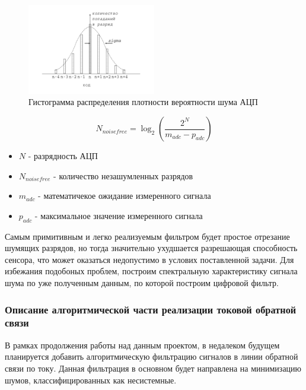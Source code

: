 \begin{figure}[!ht]
    \centering
    \includegraphics[width=0.5\textwidth, keepaspectratio, clip=true, trim=5mm 10mm 5mm 5mm]
                    {./src/pictures/adc_noise_probabilistic_estimate}
    \caption{Гистограмма распределения плотности вероятности шума АЦП}
    \label{pic_adc_noise_probabilistic_estimate}
\end{figure}

\begin{equation}
    \label{eq_noise_free_code_resolution}
    N_{noise free} = \log_{2}{( \frac{ 2^{N} }{ m_{adc} - p_{adc} } )}
\end{equation}

\begin{itemize}
    \item $ N $ - разрядность АЦП
    \item $ N_{noise free} $ - количество незашумленных разрядов
    \item $ m_{adc} $ - математичекое ожидание измеренного сигнала
    \item $ p_{adc} $ - максимальное значение измеренного сигнала
\end{itemize}

Самым примитивным и легко реализуемым фильтром будет простое отрезание шумящих разрядов,
но тогда значительно ухудшается разрешающая способность сенсора, что может
оказаться недопустимо в услових поставленной задачи. Для избежания подобоных проблем,
построим спектральную характеристику сигнала шума по уже полученным данным, по которой
построим цифровой фильтр.

\subsubsection{ Описание алгоритмической части реализации токовой обратной связи }

В рамках продолжения работы над данным проектом, в недалеком будущем планируется добавить
алгоритмическую фильтрацию сигналов в линии обратной связи по току. Данная фильтрация в
основном будет направлена на минимизацию шумов, классифицированных как несистемные.

\endinput

